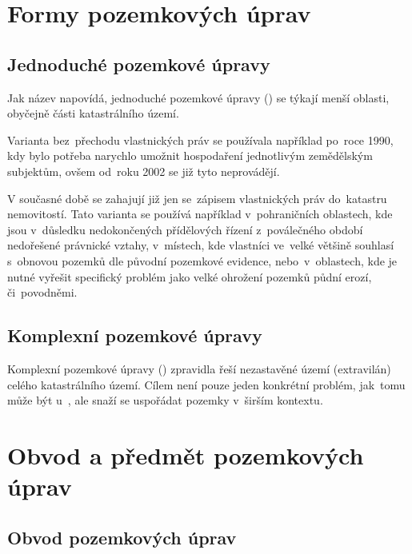 \section{Formy pozemkových úprav}
\label{formy_pu}

\subsection{Jednoduché pozemkové úpravy}
\label{jednoduche_pu}

Jak název napovídá, jednoduché pozemkové úpravy () se týkají menší oblasti, obyčejně části katastrálního území.

Varianta  bez~přechodu vlastnických práv se používala například po~roce 1990, kdy bylo potřeba narychlo umožnit hospodaření jednotlivým zemědělským subjektům, ovšem od~roku 2002 se již tyto  neprovádějí.

V současné době se zahajují již jen  se~zápisem vlastnických práv do~katastru nemovitostí. Tato varianta  se používá například v~pohraničních oblastech, kde jsou v~důsledku nedokončených přídělových řízení z~poválečného období nedořešené právnické vztahy, v~místech, kde vlastníci ve~velké většině souhlasí s~obnovou pozemků dle původní pozemkové evidence, nebo~v~oblastech, kde je nutné vyřešit specifický problém jako velké ohrožení pozemků půdní erozí, či~povodněmi.

\subsection{Komplexní pozemkové úpravy}
\label{komplexní_pu}

Komplexní pozemkové úpravy () zpravidla řeší nezastavěné území (extravilán) celého katastrálního území. Cílem  není pouze jeden konkrétní problém, jak~tomu může být u~, ale snaží se uspořádat pozemky v~širším kontextu. 

\section{Obvod a předmět pozemkových úprav}
\label{obvod_a_predmet_pu}

\subsection{Obvod pozemkových úprav}
\label{obvod_pu}

